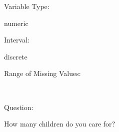 \documentclass[
]{article}
\begin{document}
\begin{minipage}[t]{0.3\linewidth}

Variable Type:

\end{minipage}%
\begin{minipage}[t]{0.7\linewidth}

numeric

\end{minipage}

\begin{minipage}[t]{0.3\linewidth}

Interval:

\end{minipage}%
\begin{minipage}[t]{0.7\linewidth}

discrete

\end{minipage}

\begin{minipage}[t]{0.3\linewidth}

Range of Missing Values:

\end{minipage}%
\begin{minipage}[t]{0.7\linewidth}

~

\end{minipage}

\begin{minipage}[t]{0.3\linewidth}

Question:

\end{minipage}%
\begin{minipage}[t]{0.7\linewidth}

How many children do you care for?

\end{minipage}
\end{document}
